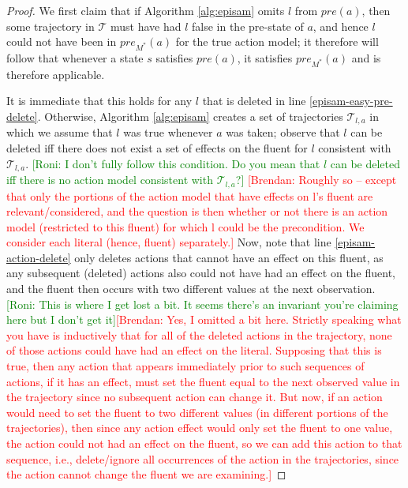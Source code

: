\documentclass[letterpaper]{article} %
\newcommand{\pre}{\textit{pre}}
\newcommand{\brendan}[1]{{\textcolor{red}{[Brendan: #1]}}}
\newcommand{\roni}[1]{{\textcolor{green}{[Roni: #1]}}}
\begin{document}
\begin{proof}
We first claim that if Algorithm \ref{alg:episam} omits $l$ from $\pre(a)$, then some trajectory in $\mathcal{T}$ must have had $l$ false in the pre-state of $a$, and hence $l$ could not have been in $\pre_{M^*}(a)$ for the true action model; it therefore will follow that whenever a state $s$ satisfies $\pre(a)$, it satisfies $\pre_{M^*}(a)$ and is therefore applicable.

It is immediate that this holds for any $l$ that is deleted in line \ref{episam-easy-pre-delete}. 
Otherwise, Algorithm \ref{alg:episam} creates a set of trajectories $\mathcal{T}_{l,a}$ in which we assume that $l$ was true whenever $a$ was taken; 
observe that $l$ can be deleted iff there does not exist a set of effects on the fluent for $l$ consistent with $\mathcal{T}_{l,a}$. \roni{I don't fully follow this condition. Do you mean that $l$ can be deleted iff there is no action model consistent with $\mathcal{T}_{l,a}$?} \brendan{Roughly so -- except that only the portions of the action model that have effects on l's fluent are relevant/considered, and the question is then whether or not there is an action model (restricted to this fluent) for which l could be the precondition. We consider each literal (hence, fluent) separately.}
Now, note that line \ref{episam-action-delete} only deletes actions that cannot have an effect on this fluent, as any subsequent (deleted) actions also could not have had an effect on the fluent, and the fluent then occurs with two different values at the next observation. 
\roni{This is where I get lost a bit. It seems there's an invariant you're claiming here but I don't get it}\brendan{Yes, I omitted a bit here. Strictly speaking what you have is inductively that for all of the deleted actions in the trajectory, none of those actions could have had an effect on the literal. Supposing that this is true, then any action that appears immediately prior to such sequences of actions, if it has an effect, must set the fluent equal to the next observed value in the trajectory since no subsequent action can change it. But now, if an action would need to set the fluent to two different values (in different portions of the trajectories), then since any action effect would only set the fluent to one value, the action could not had an effect on the fluent, so we can add this action to that sequence, i.e., delete/ignore all occurrences of the action in the trajectories, since the action cannot change the fluent we are examining.}

\end{proof}
\end{document}
